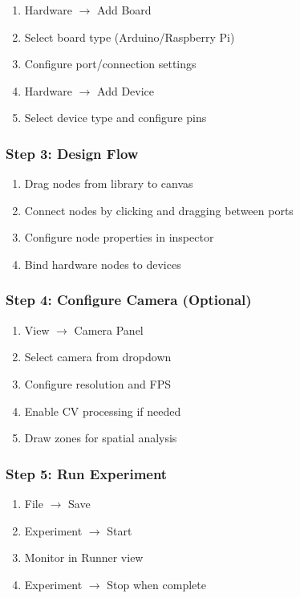 \documentclass[11pt,a4paper]{article}
\begin{document}
\begin{enumerate}    \item Hardware $\rightarrow$ Add Board
    \item Select board type (Arduino/Raspberry Pi)
    \item Configure port/connection settings
    \item Hardware $\rightarrow$ Add Device
    \item Select device type and configure pins
\end{enumerate}

\subsubsection{Step 3: Design Flow}

\begin{enumerate}    \item Drag nodes from library to canvas
    \item Connect nodes by clicking and dragging between ports
    \item Configure node properties in inspector
    \item Bind hardware nodes to devices
\end{enumerate}

\subsubsection{Step 4: Configure Camera (Optional)}

\begin{enumerate}    \item View $\rightarrow$ Camera Panel
    \item Select camera from dropdown
    \item Configure resolution and FPS
    \item Enable CV processing if needed
    \item Draw zones for spatial analysis
\end{enumerate}

\subsubsection{Step 5: Run Experiment}

\begin{enumerate}    \item File $\rightarrow$ Save
    \item Experiment $\rightarrow$ Start
    \item Monitor in Runner view
    \item Experiment $\rightarrow$ Stop when complete
\end{enumerate}
\end{document}
